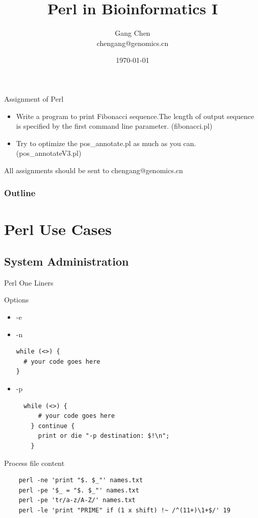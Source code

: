 \documentclass[UTF8]{beamer}
\title{Perl in Bioinformatics I}
\author{Gang Chen\\ chengang@genomics.cn}
\date{\today}
\begin{document}
\begin{frame}
\begin{block}{Assignment of Perl}
\begin{itemize}
\item Write a program to print Fibonacci sequence.The length of output sequence
is specified by the first command line parameter. (fibonacci.pl)
\item Try to optimize the pos_annotate.pl as much as you can. (pos_annotateV3.pl)
\end{itemize}
All assignments should be sent to chengang@genomics.cn
\end{block}
\end{frame}

\begin{frame}
\titlepage
\end{frame}
\begin{frame}[t]\frametitle{Outline}
\tableofcontents[hideallsubsections]
\end{frame}


\section{Perl Use Cases}

\subsection{System Administration}

\begin{frame}[fragile]{Perl One Liners}
\begin{block}{Options}
  \begin{itemize}
    \item -e
    \item -n
    \begin{verbatim}
while (<>) {
  # your code goes here
}
    \end{verbatim}
    \item -p
\begin{verbatim}
  while (<>) {
      # your code goes here
    } continue {
      print or die "-p destination: $!\n";
    }
\end{verbatim}
  \end{itemize}
\end{block}
\end{frame}

\begin{frame}[fragile]{Process file content}
  \begin{verbatim}
    perl -ne 'print "$. $_"' names.txt
    perl -pe '$_ = "$. $_"' names.txt
    perl -pe 'tr/a-z/A-Z/' names.txt
    perl -le 'print "PRIME" if (1 x shift) !~ /^(11+)\1+$/' 19
  \end{verbatim}

\end{frame}
\end{document}
